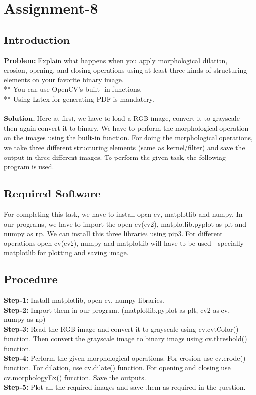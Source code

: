 \documentclass{article}
\begin{document}
{
    \section{Assignment-8}
    \subsection{Introduction}
    \textbf {Problem: }
    Explain what happens when you apply morphological dilation, erosion, opening, and closing operations using at least three kinds of structuring elements on your favorite binary image.\\
    ** You can use OpenCV's built -in functions.\\
    ** Using Latex for generating PDF is mandatory.\\
    \\
    \textbf{Solution: }
    Here at first, we have to load a RGB image, convert it to grayscale then again convert it to binary. We have to perform the morphological operation on the images using the built-in function. For doing the morphological operations, we take three different structuring elements (same as kernel/filter) and save the output in three different images. To perform the given task, the following program is used.
    \\
    
    \subsection{Required Software}
    For completing this task, we have to install open-cv, matplotlib and numpy. In our programs, we have to import the open-cv(cv2), matplotlib.pyplot as plt and numpy as np. We can install this three libraries using pip3. For different operations open-cv(cv2), numpy and matplotlib will have to be used - specially matplotlib for plotting and saving image. 
    \\
    
    \subsection{Procedure}
    \textbf{Step-1:}
    Install matplotlib, open-cv, numpy libraries.\\
    \textbf{Step-2:}
    Import them in our program. (matplotlib.pyplot as plt, cv2 as cv, numpy as np)\\
    \textbf{Step-3:}
    Read the RGB image and convert it to grayscale using cv.cvtColor() function. Then convert the grayscale image to binary image using cv.threshold() function.\\
    \textbf{Step-4:}
    Perform the given morphological operations. For erosion use cv.erode() function. For dilation, use cv.dilate() function. For opening and closing use cv.morphologyEx() function. Save the outputs.\\
    \textbf{Step-5:}
    Plot all the required images and save them as required in the question.\\
    
}
\end{document}
